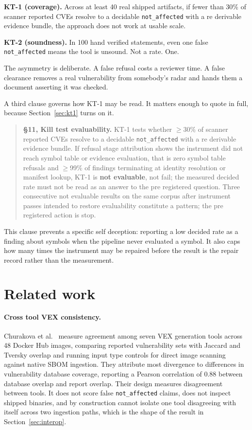 \textbf{KT-1 (coverage).} Across at least 40 real shipped artifacts, if fewer than
30\% of scanner reported CVEs resolve to a decidable \texttt{not\_affected} with
a re derivable evidence bundle, the approach does not work at usable scale.

\textbf{KT-2 (soundness).} In 100 hand verified statements, even one false
\texttt{not\_affected} means the tool is unsound. Not a rate. One.

The asymmetry is deliberate. A false refusal costs a reviewer time. A false
clearance removes a real vulnerability from somebody's radar and hands them a
document asserting it was checked.

A third clause governs how KT-1 may be read. It matters enough to quote in full,
because Section~\ref{sec:kt1} turns on it.

\begin{quote}
\textbf{\S11, Kill test evaluability.} KT-1 tests whether $\geq$30\% of scanner
reported CVEs resolve to a decidable \texttt{not\_affected} with a re derivable
evidence bundle. If refusal stage attribution shows the instrument did not reach
symbol table or evidence evaluation, that is zero symbol table refusals and
$\geq$99\% of findings terminating at identity resolution or manifest lookup,
KT-1 is \textbf{not evaluable}, not fail; the measured decided rate must not be
read as an answer to the pre registered question. Three consecutive not evaluable
results on the same corpus after instrument passes intended to restore
evaluability constitute a pattern; the pre registered action is stop.
\end{quote}

This clause prevents a specific self deception: reporting a low decided rate as a
finding about symbols when the pipeline never evaluated a symbol. It also caps
how many times the instrument may be repaired before the result is the repair
record rather than the measurement.

\section{Related work}
\label{sec:related}

\paragraph{Cross tool VEX consistency.} Churakova et al.~\cite{churakova} measure
agreement among seven VEX generation tools across 48 Docker Hub images, comparing
reported vulnerability sets with Jaccard and Tversky overlap and running input
type controls for direct image scanning against native SBOM ingestion. They
attribute most divergence to differences in vulnerability database coverage,
reporting a Pearson correlation of 0.88 between database overlap and report
overlap. Their design measures disagreement between tools. It does not score
false \texttt{not\_affected} claims, does not inspect shipped binaries, and by
construction cannot isolate one tool disagreeing with itself across two ingestion
paths, which is the shape of the result in Section~\ref{sec:interop}.

